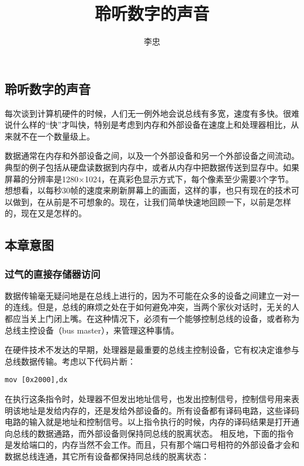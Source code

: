 \documentclass[12pt]{article}
\begin{document}
\begin{CJK}{UTF8}{gbsn} %

\title{聆听数字的声音}
\author{李忠}

\maketitle

\newpage
\tableofcontents
\newpage

\section{聆听数字的声音}
每次谈到计算机硬件的时候，人们无一例外地会说总线有多宽，速度有多快。很难说什么样的“快”才叫快，特别是考虑到内存和外部设备在速度上和处理器相比，从来就不在一个数量级上。

数据通常在内存和外部设备之间，以及一个外部设备和另一个外部设备之间流动。典型的例子包括从硬盘读数据到内存中，或者从内存中把数据传送到显存中。如果屏幕的分辨率是1280×1024，在真彩色显示方式下，每个像素至少需要3个字节。想想看，以每秒30帧的速度来刷新屏幕上的画面，这样的事，也只有现在的技术可以做到，在从前是不可想象的。现在，让我们简单快速地回顾一下，以前是怎样的，现在又是怎样的。

\subsection{本章意图}
\subsubsection{过气的直接存储器访问}
数据传输毫无疑问地是在总线上进行的，因为不可能在众多的设备之间建立一对一的连线。但是，总线的麻烦之处在于如何避免冲突，当两个家伙对话时，无关的人都应当关上门闭上嘴。在这种情况下，必须有一个能够控制总线的设备，或者称为总线主控设备（bus master），来管理这种事情。

在硬件技术不发达的早期，处理器是最重要的总线主控制设备，它有权决定谁参与总线数据传输。考虑以下代码片断：

\begin{verbatim}
mov [0x2000],dx
\end{verbatim}

在执行这条指令时，处理器不但发出地址信号，也发出控制信号，控制信号用来表明该地址是发给内存的，还是发给外部设备的。所有设备都有译码电路，这些译码电路的输入就是地址和控制信号。以上指令执行的时候，内存的译码结果是打开通向总线的数据通路，而外部设备则保持同总线的脱离状态。
相反地，下面的指令是发给端口的，内存当然不会工作。而且，只有那个端口号相符的外部设备才会和数据总线连通，其它所有设备都保持同总线的脱离状态：


\end{CJK}
\end{document}

